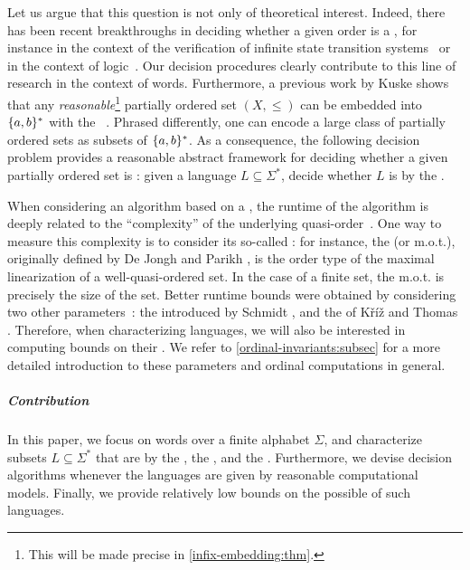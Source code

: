 \AP Let us argue that this question is not only of theoretical interest.
Indeed, there has been recent breakthroughs in deciding whether a given order
is a , for instance in the context of the verification of
infinite state transition systems~\cite{DBLP:conf/fsttcs/FinkelG19} or in the
context of logic~\cite{DBLP:journals/pacmpl/BergstrasserGLZ24}. Our decision
procedures clearly contribute to this line of research in the context of words.
Furthermore, a previous work by Kuske shows that any
\emph{reasonable}\footnote{ This will be made precise in
\cref{infix-embedding:thm}. } partially ordered set $(X, \leq)$ can
be embedded into $\{ a,b \}^*$ with the ~\cite[Lemma
5.1]{DBLP:journals/ita/Kuske06}. Phrased differently, one can encode a large
class of partially ordered sets as subsets of $\{ a,b \}^*$. As a consequence,
the following decision problem provides a reasonable abstract framework for
deciding whether a given partially ordered set is :
given a language $L \subseteq \Sigma^*$, decide whether $L$ is
 by the .

\AP When considering an algorithm based on a , the
runtime of the algorithm is deeply related to the ``complexity'' of the
underlying quasi-order~\cite{SCHMITZ17}. One way to measure this complexity is
to consider its so-called : for instance, the
 (or m.o.t.), originally defined by De Jongh and Parikh
\cite{dejongh77}, is the order type of the maximal linearization of a
well-quasi-ordered set. In the case of a finite set, the m.o.t. is precisely
the size of the set. Better runtime bounds were obtained by considering two
other parameters~\cite{SCHMITZ19}: the  introduced by
Schmidt \cite{schmidt81}, and the  of Kříž and Thomas
\cite{kriz90b}. Therefore, when characterizing 
languages, we will also be interested in computing bounds on their . We refer to \cref{ordinal-invariants:subsec}
for a more detailed introduction to these
parameters and ordinal computations in general.

\subparagraph{Contribution} In this paper, we focus on words over a finite
alphabet $\Sigma$, and characterize subsets $L \subseteq \Sigma^*$ that are
 by the , the ,
and the . Furthermore, we devise decision algorithms
whenever the languages are given by reasonable computational models. Finally,
we provide relatively low bounds on the possible  of
such languages.

